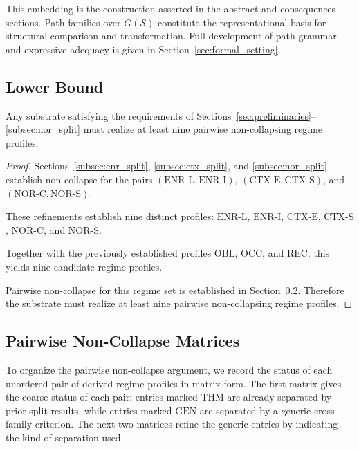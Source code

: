 This embedding is the construction asserted in the abstract and
consequences sections. Path families over $G(\mathcal{S})$ constitute
the representational basis for structural comparison and transformation.
Full development of path grammar and expressive adequacy
is given in Section~\ref{sec:formal_setting}.


\subsection{Lower Bound}

\begin{theorem}
Any substrate satisfying the requirements of
Sections~\ref{sec:preliminaries}--\ref{subsec:nor_split}
must realize at least nine pairwise non-collapsing regime profiles.
\end{theorem}

\begin{proof}
Sections~\ref{subsec:enr_split}, \ref{subsec:ctx_split}, and \ref{subsec:nor_split}
establish non-collapse for the pairs
$(\mathrm{ENR\mbox{-}L}, \mathrm{ENR\mbox{-}I})$,
$(\mathrm{CTX\mbox{-}E}, \mathrm{CTX\mbox{-}S})$, and
$(\mathrm{NOR\mbox{-}C}, \mathrm{NOR\mbox{-}S})$.

These refinements establish nine distinct profiles:
$\mathrm{ENR\mbox{-}L}$, $\mathrm{ENR\mbox{-}I}$,
$\mathrm{CTX\mbox{-}E}$, $\mathrm{CTX\mbox{-}S}$,
$\mathrm{NOR\mbox{-}C}$, and $\mathrm{NOR\mbox{-}S}$.

Together with the previously established profiles
$\mathrm{OBL}$, $\mathrm{OCC}$, and $\mathrm{REC}$,
this yields nine candidate regime profiles.

Pairwise non-collapse for this regime set is established in
Section~\ref{subsec:pairwise_noncollapse}.
Therefore the substrate must realize at least nine pairwise non-collapsing regime profiles.
\end{proof}

\subsection{Pairwise Non-Collapse Matrices}
\label{subsec:pairwise_noncollapse}

To organize the pairwise non-collapse argument, we record the status of each unordered pair
of derived regime profiles in matrix form.
The first matrix gives the coarse status of each pair:
entries marked $\mathrm{THM}$ are already separated by prior split results,
while entries marked $\mathrm{GEN}$ are separated by a generic cross-family criterion.
The next two matrices refine the generic entries by indicating the kind of separation used.

